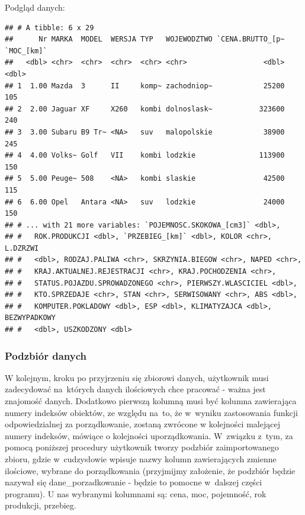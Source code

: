 \documentclass[12pt,a4paper]{report}
\begin{document}
{Podgląd danych:

\begin{Shaded}
\begin{Highlighting}[]
\end{Highlighting}
\end{Shaded}

\begin{verbatim}
## # A tibble: 6 x 29
##      Nr MARKA  MODEL  WERSJA TYP   WOJEWODZTWO `CENA.BRUTTO_[p~ `MOC_[km]`
##   <dbl> <chr>  <chr>  <chr>  <chr> <chr>                  <dbl>      <dbl>
## 1  1.00 Mazda  3      II     komp~ zachodniop~            25200        105
## 2  2.00 Jaguar XF     X260   kombi dolnoslask~           323600        240
## 3  3.00 Subaru B9 Tr~ <NA>   suv   malopolskie            38900        245
## 4  4.00 Volks~ Golf   VII    kombi lodzkie               113900        150
## 5  5.00 Peuge~ 508    <NA>   kombi slaskie                42500        115
## 6  6.00 Opel   Antara <NA>   suv   lodzkie                24000        150
## # ... with 21 more variables: `POJEMNOSC.SKOKOWA_[cm3]` <dbl>,
## #   ROK.PRODUKCJI <dbl>, `PRZEBIEG_[km]` <dbl>, KOLOR <chr>, L.DZRZWI
## #   <dbl>, RODZAJ.PALIWA <chr>, SKRZYNIA.BIEGOW <chr>, NAPED <chr>,
## #   KRAJ.AKTUALNEJ.REJESTRACJI <chr>, KRAJ.POCHODZENIA <chr>,
## #   STATUS.POJAZDU.SPROWADZONEGO <chr>, PIERWSZY.WLASCICIEL <dbl>,
## #   KTO.SPRZEDAJE <chr>, STAN <chr>, SERWISOWANY <chr>, ABS <dbl>,
## #   KOMPUTER.POKLADOWY <dbl>, ESP <dbl>, KLIMATYZAJCA <dbl>, BEZWYPADKOWY
## #   <dbl>, USZKODZONY <dbl>
\end{verbatim}

\subsubsection{Podzbiór danych}\label{podzbior-danych}

W kolejnym, kroku po przyjrzeniu się zbiorowi danych, użytkownik musi
zadecydować na~których danych ilościowych chce pracować - ważna jest
znajomość danych. Dodatkowo pierwszą kolumną musi być kolumna
zawierająca numery indeksów obiektów, ze względu na~to, że w~wyniku
zastosowania funkcji odpowiedzialnej za porządkowanie, zostaną zwrócone
w kolejności malejącej numery indeksów, mówiące o kolejności
uporządkowania. W~związku z~tym, za pomocą poniższej procedury
użytkownik tworzy podzbiór zaimportowanego zbioru, gdzie w~cudzysłowie
wpisuje nazwy kolumn zawierających zmienne ilościowe, wybrane do
porządkowania (przyjmijmy założenie, że podzbiór będzie nazywał się
dane\_porzadkowanie - będzie to pomocne w~dalszej części programu). U
nas wybranymi kolumnami są: cena, moc, pojemność, rok produkcji,
przebieg.

}
\end{document}
